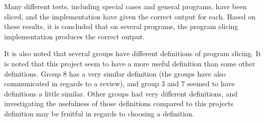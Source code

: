 Many different tests, including special cases and general programs,
have been sliced, and the implementation have given the correct output
for each. Based on these results, it is concluded that on several
programs, the program slicing implementation produces the correct output.

It is also noted that several groups have different definitions of program slicing.
It is noted that this project seem to have a more useful definition than some
other definitions.
Group 8 has a very similar definition (the groups have also communicated in regards
to a review), and group 3 and 7 seemed to have definitions a little similar.
Other groups had very different definitions, and investigating the usefulness of
those definitions compared to this projects definition may be fruitful in regards
to choosing a definition.

